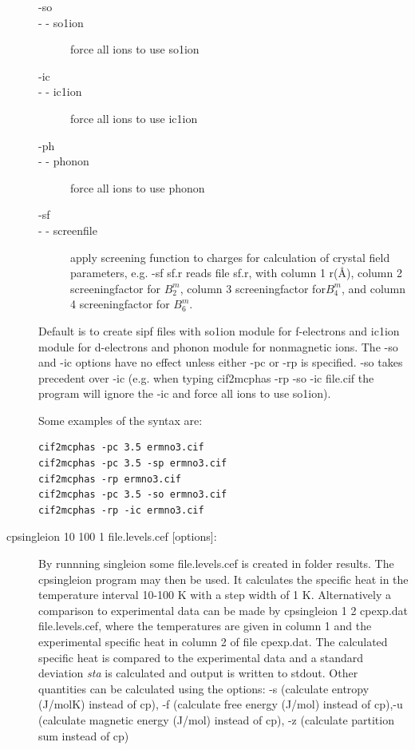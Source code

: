 \begin{description}
\begin{description}
\item[-so       ] \item[- - so1ion]  force all ions to use so1ion
\item[-ic        ]\item[- - ic1ion]  force all ions to use ic1ion
\item[-ph        ] \item[- - phonon] force all ions to use phonon
\item[-sf ]\item[- - screenfile]  apply screening function to charges for calculation of crystal field parameters,
                           e.g. {\prg -sf sf.r} reads file {\prg sf.r}, with column 1 r(\AA),
 column 2  screeningfactor for $B_2^m$, column 3 screeningfactor for$ B_4^m$, and column 4
screeningfactor for $B_6^m$.
\end{description}


Default is to create sipf files with so1ion module for f-electrons and ic1ion module for d-electrons
and phonon module for nonmagnetic ions.
 The {\prg -so} and {\prg -ic} options have no effect unless either {\prg -pc}
 or {\prg -rp} is specified.
{\prg -so} takes precedent over {\prg -ic} (e.g. 
when typing {\prg cif2mcphas -rp -so -ic file.cif} the program will ignore the
{\prg -ic} and force all ions to use so1ion).

Some examples of the syntax are:
\begin{verbatim}
cif2mcphas -pc 3.5 ermno3.cif
cif2mcphas -pc 3.5 -sp ermno3.cif
cif2mcphas -rp ermno3.cif
cif2mcphas -pc 3.5 -so ermno3.cif
cif2mcphas -rp -ic ermno3.cif
\end{verbatim}

\item [\prg cpsingleion 10 100 1 file.levels.cef {[options]}: ] 
By runnning {\prg singleion} some file.levels.cef is created in folder results.
The {\prg cpsingleion} program may then be used. It
calculates the specific heat in the temperature 
interval 10-100 K with a step width
of 1 K. Alternatively a comparison to experimental data can be made by {\prg cpsingleion 1 2 
cpexp.dat file.levels.cef},
where the temperatures are given in column 1 and the experimental specific heat in column
2 of file cpexp.dat. The calculated specific heat is compared to the experimental data and
a standard deviation {\em sta} is calculated and output is written to stdout.
Other quantities can be calculated using the options: -s  (calculate entropy  (J/molK) instead %
of cp),
-f (calculate free energy (J/mol) instead of cp),-u  (calculate magnetic energy (J/mol) instead %
of cp),
-z (calculate partition sum instead of cp)


\end{description}
